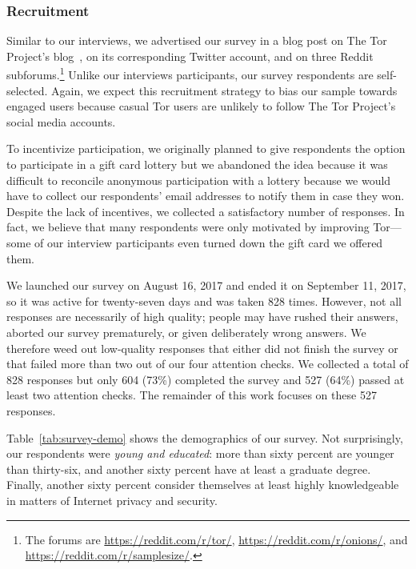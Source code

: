 \subsubsection{Recruitment}

Similar to our interviews, we advertised our survey \first in a blog post on The Tor
Project's blog~\cite{Winter2017a}, \second on its corresponding Twitter account,
and \third on three Reddit subforums.\footnote{The forums are
\url{https://reddit.com/r/tor/}, \url{https://reddit.com/r/onions/}, and
\url{https://reddit.com/r/samplesize/}.}  Unlike our interviews participants,
our survey respondents are self-selected.  Again, we expect this recruitment
strategy to bias our sample towards engaged users because casual Tor users are
unlikely to follow The Tor Project's social media accounts.

To incentivize participation, we originally planned to give respondents the
option to participate in a gift card lottery but we abandoned the idea because
it was difficult to reconcile anonymous participation with a lottery because we
would have to collect our respondents' email addresses to notify them in case
they won.  Despite the lack of incentives, we collected a satisfactory number of
responses.  In fact, we believe that many respondents were only motivated by
improving Tor---some of our interview participants even turned down the gift
card we offered them.

We launched our survey on August 16, 2017 and ended it on September 11, 2017, so
it was active for twenty-seven days and was taken 828 times.  However, not all
responses are necessarily of high quality; people may have rushed their answers,
aborted our survey prematurely, or given deliberately wrong answers.  We
therefore weed out low-quality responses that either did not finish the survey
or that failed more than two out of our four attention checks.  We collected a
total of 828 responses but only 604 (73\%) completed the survey and 527 (64\%)
passed at least two attention checks.  The remainder of this work focuses on
these 527 responses.

Table~\ref{tab:survey-demo} shows the demographics of our survey.  Not
surprisingly, our respondents were \emph{young and educated}: more than sixty
percent are younger than thirty-six, and another sixty percent have at least a
graduate degree.  Finally, another sixty percent consider themselves at least
highly knowledgeable in matters of Internet privacy and security.

